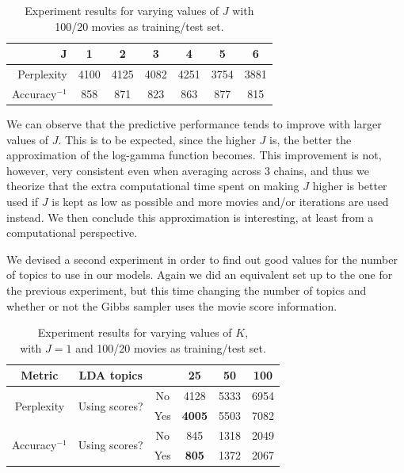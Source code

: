 \documentclass{article} %
\begin{document}
\begin{table}[ht!]
\caption{Experiment results for varying values of $J$ with 100/20 movies as training/test set.}
\label{table:J}
\begin{center}
\begin{tabular}{r|cccccc}
J               & 1 & 2 & 3 & 4 & 5 & 6 \\ \hline
Perplexity      & 4100 & 4125 & 4082 & 4251 & 3754 & 3881 \\
Accuracy$^{-1}$ & 858 & 871 & 823 & 863 & 877 & 815 \\
\end{tabular}
\end{center}
\end{table}

We can observe that the predictive performance tends to improve with larger values of $J$. 
This is to be expected, since the higher $J$ is, the better the approximation of the log-gamma function becomes.
This improvement is not, however, very consistent even when averaging across 3 chains, and thus we theorize that the extra computational time spent on making $J$ higher is better used if $J$ is kept as low as possible and more movies and/or iterations are used instead.
We then conclude this approximation is interesting, at least from a computational perspective.

We devised a second experiment in order to find out good values for the number of topics to use in our models.
Again we did an equivalent set up to the one for the previous experiment, but this time changing the number of topics and whether or not the Gibbs sampler uses the movie score information.

\begin{table}[ht!]
\captionsetup{justification=centering}
\caption{Experiment results for varying values of $K$,\\ with $J=1$ and 100/20 movies as training/test set.} 
\label{tab:K}
\begin{center}
\begin{tabular}{c|cc|ccc}

Metric &	LDA topics      & & 25 & 50 & 100 \\ \hline
\multirow{2}{*}{Perplexity} &	\multirow{2}{*}{Using scores?} & No  & 4128 & 5333 & 6954 \\
			  &             & Yes & \textbf{4005} & 5503 & 7082 \\ \hline
\multirow{2}{*}{Accuracy$^{-1}$} & \multirow{2}{*}{Using scores?} & No  & 845 & 1318 & 2049 \\
			      &          & Yes & \textbf{805} & 1372 & 2067 \\
\end{tabular}
\end{center}
\end{table}
\end{document}
